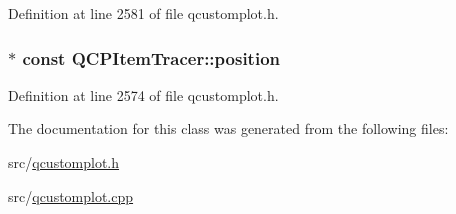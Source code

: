 Definition at line 2581 of file qcustomplot.\-h.

\hypertarget{class_q_c_p_item_tracer_a69917e2fdb2b3a929c196958feee7cbe}{
\subsubsection[{position}]{$\ast$ const Q\-C\-P\-Item\-Tracer\-::position}}\label{class_q_c_p_item_tracer_a69917e2fdb2b3a929c196958feee7cbe}


Definition at line 2574 of file qcustomplot.\-h.



The documentation for this class was generated from the following files\-:\begin{DoxyCompactItemize}
\item 
src/\hyperlink{qcustomplot_8h}{qcustomplot.\-h}\item 
src/\hyperlink{qcustomplot_8cpp}{qcustomplot.\-cpp}\end{DoxyCompactItemize}

